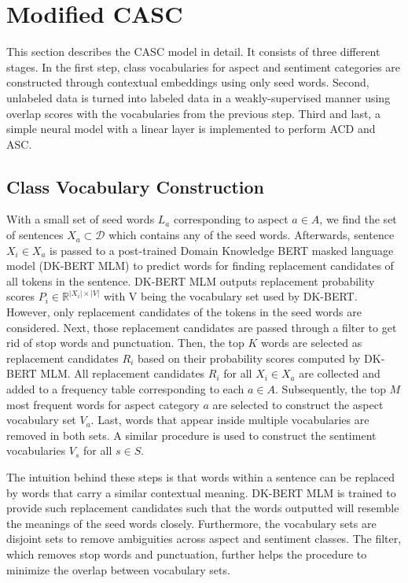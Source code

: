 \documentclass[american, oneside]{ecsgdp}
\begin{document}
\section{Modified CASC} \label{sec:CASC}
This section describes the CASC model in detail. It consists of three different stages. In the first step, class vocabularies for aspect and sentiment categories are constructed through contextual embeddings using only seed words. Second, unlabeled data is turned into labeled data in a weakly-supervised manner using overlap scores with the vocabularies from the previous step. Third and last, a simple neural model with a linear layer is implemented to perform ACD and ASC.

\subsection{Class Vocabulary Construction}
With a small set of seed words $L_a$ corresponding to aspect $a \in A$, we find the set of sentences $X_a \subset \mathcal{D}$ which contains any of the seed words. Afterwards, sentence $X_i \in X_a$ is passed to a post-trained Domain Knowledge BERT masked language model (DK-BERT MLM) to predict words for finding replacement candidates of all tokens in the sentence. DK-BERT MLM outputs replacement probability scores $P_i \in \mathbb{R}^{\lvert X_i \rvert \times \lvert V \rvert}$ with V being the vocabulary set used by DK-BERT. However, only replacement candidates of the tokens in the seed words are considered. Next, those replacement candidates are passed through a filter to get rid of stop words and punctuation. Then, the top $K$ words are selected as replacement candidates $R_i$ based on their probability scores computed by DK-BERT MLM. All replacement candidates $R_i$ for all $X_i \in X_a$ are collected and added to a frequency table corresponding to each $a \in A$. Subsequently, the top $M$ most frequent words for aspect category $a$ are selected to construct the aspect vocabulary set $V_a$. Last, words that appear inside multiple vocabularies are removed in both sets. A similar procedure is used to construct the sentiment vocabularies $V_s$ for all $s \in S$.

The intuition behind these steps is that words within a sentence can be replaced by words that carry a similar contextual meaning. DK-BERT MLM is trained to provide such replacement candidates such that the words outputted will resemble the meanings of the seed words closely. Furthermore, the vocabulary sets are disjoint sets to remove ambiguities across aspect and sentiment classes. The filter, which removes stop words and punctuation, further helps the procedure to minimize the overlap between vocabulary sets.
\end{document}
